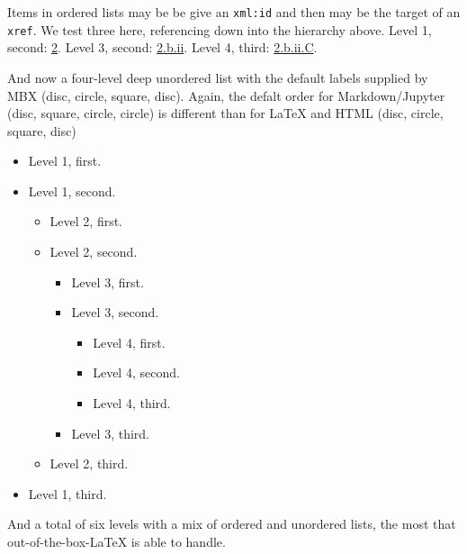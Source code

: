 \documentclass[10pt,]{article}
\theoremstyle{plain}
\theoremstyle{definition}
\theoremstyle{definition}
\theoremstyle{definition}
\theoremstyle{definition}
\theoremstyle{definition}
\theoremstyle{definition}
\numberwithin{equation}{section}
\begin{document}
%
\par
\hypertarget{p-334}{}%
Items in ordered lists may be be give an \lstinline?xml:id? and then may be the target of an \lstinline?xref?.  We test three here, referencing down into the hierarchy above.  Level 1, second: \hyperlink{list-two}{2}.  Level 3, second: \hyperlink{list-two-two-two}{2.b.ii}.  Level 4, third: \hyperlink{list-two-two-two-three}{2.b.ii.C}.%
\par
\hypertarget{p-335}{}%
And now a four-level deep unordered list with the default labels supplied by MBX (disc, circle, square, disc).  Again, the defalt order for Markdown/Jupyter (disc, square, circle, circle) is different than for \LaTeX{} and HTML (disc, circle, square, disc)\leavevmode%
\begin{itemize}[label=\textbullet]
\item{}\hypertarget{p-336}{}%
Level 1, first.%
\item{}\hypertarget{p-337}{}%
Level 1, second.%
\begin{itemize}[label=$\circ$]
\item{}\hypertarget{p-338}{}%
Level 2, first.%
\item{}\hypertarget{p-339}{}%
Level 2, second.%
\begin{itemize}[label=$\blacksquare$]
\item{}\hypertarget{p-340}{}%
Level 3, first.%
\item{}\hypertarget{p-341}{}%
Level 3, second.%
\begin{itemize}[label=\textbullet]
\item{}\hypertarget{p-342}{}%
Level 4, first.%
\item{}\hypertarget{p-343}{}%
Level 4, second.%
\item{}\hypertarget{p-344}{}%
Level 4, third.%
\end{itemize}
%
\item{}\hypertarget{p-345}{}%
Level 3, third.%
\end{itemize}
%
\item{}\hypertarget{p-346}{}%
Level 2, third.%
\end{itemize}
%
\item{}\hypertarget{p-347}{}%
Level 1, third.%
\end{itemize}
%
\par
\hypertarget{p-348}{}%
And a total of six levels with a mix of ordered and unordered lists, the most that out-of-the-box-\LaTeX{} is able to handle.\leavevmode%
\end{document}
